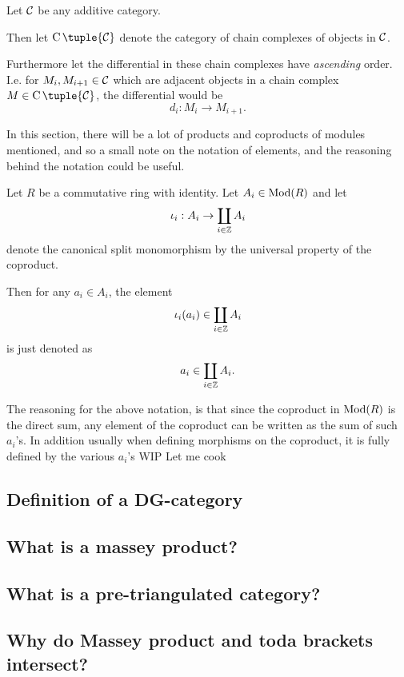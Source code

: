 \begin{notation}
    Let \( {\mathcal{C}} \) be any additive category.
    
    Then let \( \C \tuple{\Cc} \) denote the category of chain complexes of objects in \( {\mathcal{C}} \).

    Furthermore let the differential in these chain complexes have \emph{ascending} order. I.e. for \( M_i, M_{i+1} \in {\mathcal{C}} \) which are adjacent objects in a chain complex \( M \in \C \tuple{\Cc} \), the differential would be
    \[
        d_i : M_i \to M_{i + 1}.
    \]
\end{notation}

\begin{notation}
    In this section, there will be a lot of products and coproducts of modules mentioned, and so a small note on the notation of elements, and the reasoning behind the notation could be useful.

    Let \( R \) be a commutative ring with identity. Let \( A_i \in \operatorname{Mod}(R) \) and let
    \[
        \iota_i: A_i \to \coprod_{i \in {\mathbb{Z}}} A_i
    \]
    denote the canonical split monomorphism by the universal property of the coproduct.

    Then for any \( a_i \in A_i \), the element
    \[
        \iota_i(a_i) \in \coprod_{i \in {\mathbb{Z}}} A_i
    \]
    is just denoted as
    \[
        a_i \in \coprod_{i \in {\mathbb{Z}}} A_i.
    \]
    
    The reasoning for the above notation, is that since the coproduct in \( \operatorname{Mod}(R) \) is the direct sum, any element of the coproduct can be written as the sum of such \( a_i \)'s. In addition usually when defining morphisms on the coproduct, it is fully defined by the various \( a_i \)'s 
    WIP Let me cook
    
\end{notation}


\subsection{Definition of a DG-category}


\subsection{What is a massey product?}


\subsection{What is a pre-triangulated category?}


\subsection{Why do Massey product and toda brackets intersect?}

